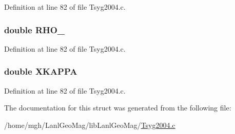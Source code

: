 Definition at line 82 of file Tsyg2004.c.\hypertarget{struct___c_b___d_p_h_i___b___r_h_o0_aaec50d7de5ec25604a887bb774a5ad2}{
\subsubsection[{RHO\_\-0}]{\setlength{\rightskip}{0pt plus 5cm}double {\bf RHO\_}}}
\label{struct___c_b___d_p_h_i___b___r_h_o0_aaec50d7de5ec25604a887bb774a5ad2}




Definition at line 82 of file Tsyg2004.c.\hypertarget{struct___c_b___d_p_h_i___b___r_h_o0_c47e67864f6ce1555c7fbb0ca0429a1b}{
\subsubsection[{XKAPPA}]{\setlength{\rightskip}{0pt plus 5cm}double {\bf XKAPPA}}}
\label{struct___c_b___d_p_h_i___b___r_h_o0_c47e67864f6ce1555c7fbb0ca0429a1b}




Definition at line 82 of file Tsyg2004.c.

The documentation for this struct was generated from the following file:\begin{CompactItemize}
\item 
/home/mgh/LanlGeoMag/libLanlGeoMag/\hyperlink{_tsyg2004_8c}{Tsyg2004.c}\end{CompactItemize}

